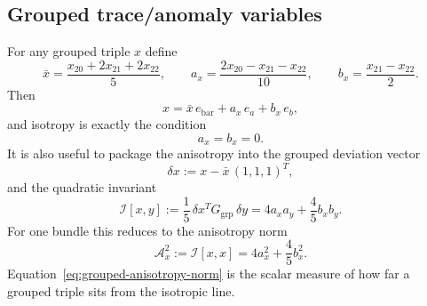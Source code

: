 \documentclass[11pt]{article}
\theoremstyle{definition}
\begin{document}
\subsection{Grouped trace/anomaly variables}

For any grouped triple $x$ define
\begin{equation}
\bar x=\frac{x_{20}+2x_{21}+2x_{22}}{5},
\qquad
 a_x=\frac{2x_{20}-x_{21}-x_{22}}{10},
\qquad
 b_x=\frac{x_{21}-x_{22}}{2}.
\label{eq:grouped-trace-anomaly}
\end{equation}
Then
\begin{equation}
 x=\bar x\,e_{\mathrm{bar}}+a_x\,e_a+b_x\,e_b,
\label{eq:grouped-decomposition}
\end{equation}
and isotropy is exactly the condition
\begin{equation}
 a_x=b_x=0.
\label{eq:grouped-isotropy-condition}
\end{equation}
It is also useful to package the anisotropy into the grouped deviation vector
\begin{equation}
 \delta x:=x-\bar x\,(1,1,1)^T,
\label{eq:grouped-deviation}
\end{equation}
and the quadratic invariant
\begin{equation}
 \mathcal I[x,y]
 :=
 \frac15\,\delta x^T G_{\mathrm{grp}}\,\delta y
 =
 4a_x a_y+\frac45 b_x b_y.
\label{eq:grouped-invariant}
\end{equation}
For one bundle this reduces to the anisotropy norm
\begin{equation}
 \mathcal A_x^2:=\mathcal I[x,x]=4a_x^2+\frac45 b_x^2.
\label{eq:grouped-anisotropy-norm}
\end{equation}
Equation~\eqref{eq:grouped-anisotropy-norm} is the scalar measure of how far a grouped triple sits from the isotropic line.
\end{document}

